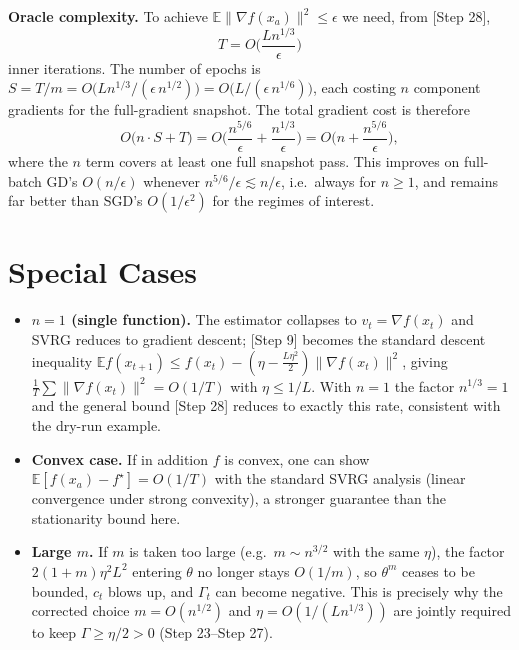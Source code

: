 \documentclass[11pt]{article}
\begin{document}

\textbf{Oracle complexity.}
To achieve $\mathbb{E}\|\nabla f(x_a)\|^2 \le \epsilon$ we need, from [Step 28],
\[
T = O\!\Big(\frac{L n^{1/3}}{\epsilon}\Big)
\]
inner iterations. The number of epochs is
$S = T/m = O\!\big(L n^{1/3}/(\epsilon\, n^{1/2})\big) = O\!\big(L/(\epsilon\, n^{1/6})\big)$,
each costing $n$ component gradients for the full-gradient snapshot. The total gradient
cost is therefore
\[
O\!\big(n\cdot S + T\big)
= O\!\Big(\frac{n^{5/6}}{\epsilon} + \frac{n^{1/3}}{\epsilon}\Big)
= O\!\Big(n + \frac{n^{5/6}}{\epsilon}\Big),
\]
where the $n$ term covers at least one full snapshot pass. This improves on full-batch
GD's $O(n/\epsilon)$ whenever $n^{5/6}/\epsilon \lesssim n/\epsilon$, i.e.\ always for
$n\ge1$, and remains far better than SGD's $O(1/\epsilon^2)$ for the regimes of interest.

\section*{Special Cases}

\begin{itemize}
\item \textbf{$n=1$ (single function).} The estimator collapses to $v_t=\nabla f(x_t)$ and
SVRG reduces to gradient descent; [Step 9] becomes the standard descent inequality
$\mathbb{E} f(x_{t+1}) \le f(x_t) - (\eta - \tfrac{L\eta^2}{2})\|\nabla f(x_t)\|^2$,
giving $\frac1T\sum\|\nabla f(x_t)\|^2 = O(1/T)$ with $\eta\le 1/L$. With $n=1$ the
factor $n^{1/3}=1$ and the general bound [Step 28] reduces to exactly this rate,
consistent with the dry-run example.

\item \textbf{Convex case.} If in addition $f$ is convex, one can show
$\mathbb{E}[f(x_a)-f^\star]=O(1/T)$ with the standard SVRG analysis (linear convergence
under strong convexity), a stronger guarantee than the stationarity bound here.

\item \textbf{Large $m$.} If $m$ is taken too large (e.g.\ $m\sim n^{3/2}$ with the same
$\eta$), the factor $2(1+m)\eta^2L^2$ entering $\theta$ no longer stays $O(1/m)$, so
$\theta^m$ ceases to be bounded, $c_t$ blows up, and $\Gamma_t$ can become negative.
This is precisely why the corrected choice $m=O(n^{1/2})$ and $\eta=O(1/(Ln^{1/3}))$
are jointly required to keep $\Gamma\ge\eta/2>0$ (Step 23--Step 27).
\end{itemize}
\end{document}
